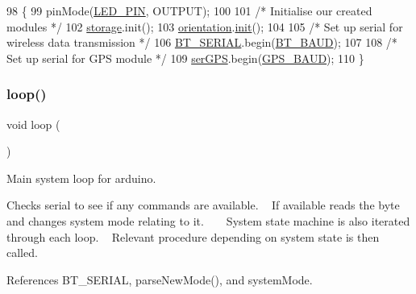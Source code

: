 \begin{DoxyCode}
98 \{
99   pinMode(\hyperlink{logging-device_8ino_ab4553be4db9860d940f81d7447173b2f}{LED\_PIN}, OUTPUT);
100 
101   \textcolor{comment}{/* Initialise our created modules */}
102   \hyperlink{logging-device_8ino_a40059244119c00baa1b841119cfd1b2e}{storage}.init();
103   \hyperlink{logging-device_8ino_a47be0262307aa023a1bda3d98986a16d}{orientation}.\hyperlink{class_orientation_a317461c5c8afa8c3abf56847d4544728}{init}();
104 
105   \textcolor{comment}{/* Set up serial for wireless data transmission */}
106   \hyperlink{logging-device_8ino_ad1e6e6f6fc813b305067b9e1b0777ea6}{BT\_SERIAL}.begin(\hyperlink{logging-device_8ino_a6882992121626898bccaa43be51ba4c2}{BT\_BAUD});
107 
108   \textcolor{comment}{/* Set up serial for GPS module */}
109   \hyperlink{logging-device_8ino_aa2475f51bdc0f31d16d2916991d618d9}{serGPS}.begin(\hyperlink{logging-device_8ino_af0875ffe69dbe45df3f85c1f720c3eee}{GPS\_BAUD});
110 \}
\end{DoxyCode}
\mbox{\label{logging-device_8ino_afe461d27b9c48d5921c00d521181f12f}} 
\subsubsection{\texorpdfstring{loop()}{loop()}}
{\footnotesize\ttfamily void loop (\begin{DoxyParamCaption}{ }\end{DoxyParamCaption})}



Main system loop for arduino. 

Checks serial to see if any commands are available. ~\newline
If available reads the byte and changes system mode relating to it. ~\newline
~\newline
System state machine is also iterated through each loop. ~\newline
Relevant procedure depending on system state is then called. 

References B\+T\+\_\+\+S\+E\+R\+I\+AL, parse\+New\+Mode(), and system\+Mode.


